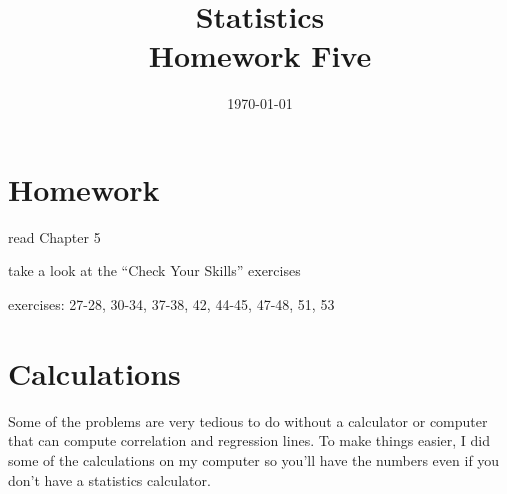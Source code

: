 \documentclass[letterpaper]{exam}
\title{Statistics \\ Homework Five}
\date{\today}
\author{}
\begin{document}
  \maketitle

  \section{Homework}
    \begin{itemize*}
      \item read Chapter 5 
      \item take a look at the ``Check Your Skills'' exercises
      \item exercises: 27-28, 30-34, 37-38, 42, 44-45, 47-48, 51, 53
    \end{itemize*}

  \ifprintanswers
  \else
    \section{Calculations}

    Some of the problems are very tedious to do without a calculator or
    computer that can compute correlation and regression lines.  To make things
    easier, I did some of the calculations on my computer so you'll have the
    numbers even if you don't have a statistics calculator.
\end{document}
